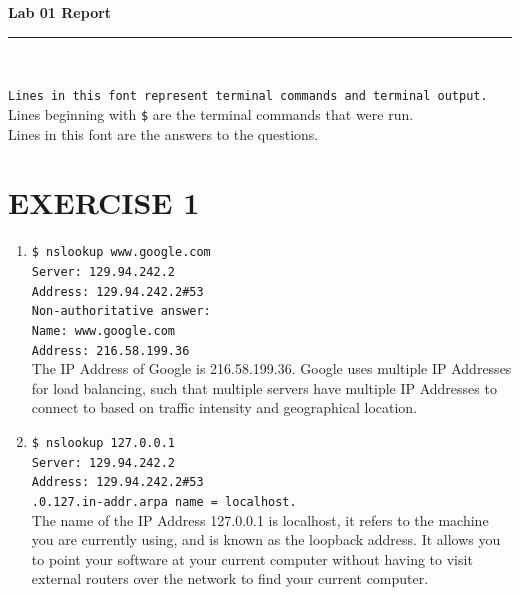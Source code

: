 \documentclass[a4paper,11pt]{article}
\newcommand{\code}{\texttt}
\newcommand{\HRule}{\rule{\linewidth}{0.5mm}} %
\begin{document}
\begin{center}
	\LARGE \textbf{Lab 01 Report}
	\HRule\\
\end{center}


\noindent \code{Lines in this font represent terminal commands and terminal output.}\\
Lines beginning with \code{\$} are the terminal commands that were run.\\
Lines in this font are the answers to the questions.

\section{EXERCISE 1}
\begin{enumerate}[leftmargin=*]
	\item 
		\code{\$ nslookup www.google.com\\
		Server:		129.94.242.2\\
		Address:	129.94.242.2\#53\\
		\newline
		Non-authoritative answer:\\
		Name:	www.google.com\\
		Address: 216.58.199.36\\}
		\newline
		The IP Address of Google is 216.58.199.36. Google uses multiple IP Addresses for load balancing, such that multiple servers have multiple IP Addresses to connect to based on traffic intensity and geographical location.
	\item 
		\code{\$ nslookup 127.0.0.1\\
		Server:		129.94.242.2\\
		Address:	129.94.242.2\#53\\
		.0.127.in-addr.arpa	name = localhost.\\}
		\newline
		The name of the IP Address 127.0.0.1 is localhost, it refers to the machine you are currently using, and is known as the loopback address. It allows you to point your software at your current computer without having to visit external routers over the network to find your current computer.
\end{enumerate}
\end{document}
